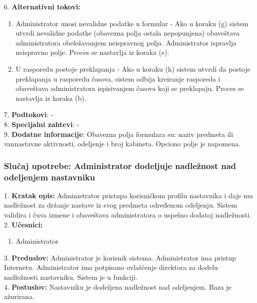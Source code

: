 \documentclass{article}
\begin{document}
6. \textbf{Alternativni tokovi:}
\begin{enumerate} [label=(\roman*)]
\item Administrator unosi nevalidne podatke u formular - Ako u koraku (g) sistem utvrdi nevalidne podatke (obavezna polja ostala nepopunjena) obaveštava administratora obeležavanjem neispravnog polja. Administrator ispravlja neispravno polje. Proces se nastavlja iz koraka (e).
\item U rasporedu postoje preklapanja - Ako u koraku (h) sistem utvrdi da postoje preklapanja u rasporedu časova, sistem odbija kreiranje rasporeda i obaveštava administratora ispisivanjem časova koji se preklapaju. Proces se nastavlja iz koraka (b).
\end{enumerate}

7. \textbf{Podtokovi}: - \\

8. \textbf{Specijalni zahtevi}: - \\

9. \textbf{Dodatne informacije}: Obavezna polja formulara su: naziv predmeta ili vannastavne aktivnosti, odeljenje i broj kabineta. Opciono polje je napomena. \\

\subsubsection{Slučaj upotrebe: Administrator dodeljuje nadležnost nad odeljenjem nastavniku}
1. \textbf{Kratak opis:} Administrator pristupa korisničkom profilu nastavnika i daje mu nadležnost za držanje nastave iz svog predmeta određenom odeljenju. Sistem validira i čuva izmene i obaveštava administratora o uspešno dodatoj nadležnosti. \\

2. \textbf{Učesnici:}
\begin{enumerate} [label=(\alph*)]
\item Administrator
\end{enumerate} 

3. \textbf{Preduslov:} Administrator je korisnik sistema. Administrator ima pristup Internetu. Administrator ima potpisano ovlašćenje direktora za dodelu nadležnosti nastavniku. Sistem je u funkciji. \\

4. \textbf{Postuslov:} Nastavniku je dodeljena nadležnost nad odeljenjem. Baza je ažurirana. \\
\end{document}

